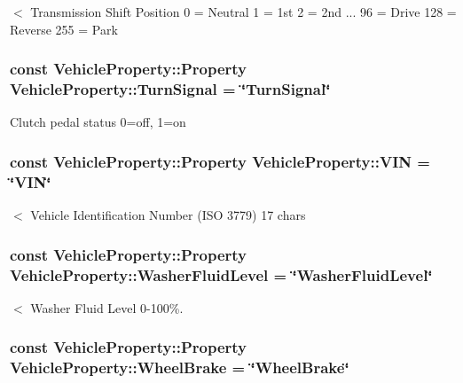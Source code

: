 $<$ Transmission Shift Position 0 = Neutral 1 = 1st 2 = 2nd ... 96 = Drive 128 = Reverse 255 = Park \hypertarget{classVehicleProperty_a0aae609c370a46a92dc52a31d2cc0310}{
\subsubsection[{Turn\-Signal}]{\setlength{\rightskip}{0pt plus 5cm}const Vehicle\-Property\-::\-Property Vehicle\-Property\-::\-Turn\-Signal = \char`\"{}Turn\-Signal\char`\"{}\hspace{0.3cm}{\ttfamily [static]}}}\label{classVehicleProperty_a0aae609c370a46a92dc52a31d2cc0310}
Clutch pedal status 0=off, 1=on \hypertarget{classVehicleProperty_ae72c1c7de185f330862c62dfb9d93a34}{
\subsubsection[{V\-I\-N}]{\setlength{\rightskip}{0pt plus 5cm}const Vehicle\-Property\-::\-Property Vehicle\-Property\-::\-V\-I\-N = \char`\"{}V\-I\-N\char`\"{}\hspace{0.3cm}{\ttfamily [static]}}}\label{classVehicleProperty_ae72c1c7de185f330862c62dfb9d93a34}
$<$ Vehicle Identification Number (I\-S\-O 3779) 17 chars \hypertarget{classVehicleProperty_a37c8c7e827625705d2f560ab53ee8d23}{
\subsubsection[{Washer\-Fluid\-Level}]{\setlength{\rightskip}{0pt plus 5cm}const Vehicle\-Property\-::\-Property Vehicle\-Property\-::\-Washer\-Fluid\-Level = \char`\"{}Washer\-Fluid\-Level\char`\"{}\hspace{0.3cm}{\ttfamily [static]}}}\label{classVehicleProperty_a37c8c7e827625705d2f560ab53ee8d23}
$<$ Washer Fluid Level 0-\/100\%. \hypertarget{classVehicleProperty_ad4f1ec038bee5ef30fbf8308aaba2794}{
\subsubsection[{Wheel\-Brake}]{\setlength{\rightskip}{0pt plus 5cm}const Vehicle\-Property\-::\-Property Vehicle\-Property\-::\-Wheel\-Brake = \char`\"{}Wheel\-Brake\char`\"{}\hspace{0.3cm}{\ttfamily [static]}}}\label{classVehicleProperty_ad4f1ec038bee5ef30fbf8308aaba2794}
